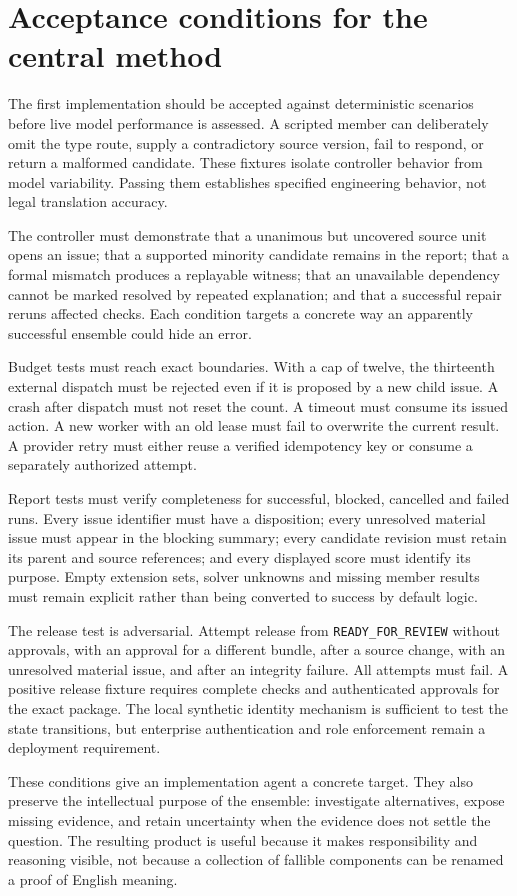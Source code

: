 \section{Acceptance conditions for the central method}
\label{merge:M06:25}


The first implementation should be accepted against deterministic scenarios
before live model performance is assessed. A scripted member can deliberately
omit the type route, supply a contradictory source version, fail to respond, or
return a malformed candidate. These fixtures isolate controller behavior from
model variability. Passing them establishes specified engineering behavior, not
legal translation accuracy.

The controller must demonstrate that a unanimous but uncovered source unit opens
an issue; that a supported minority candidate remains in the report; that a
formal mismatch produces a replayable witness; that an unavailable dependency
cannot be marked resolved by repeated explanation; and that a successful repair
reruns affected checks. Each condition targets a concrete way an apparently
successful ensemble could hide an error.

Budget tests must reach exact boundaries. With a cap of twelve, the thirteenth
external dispatch must be rejected even if it is proposed by a new child issue.
A crash after dispatch must not reset the count. A timeout must consume its
issued action. A new worker with an old lease must fail to overwrite the current
result. A provider retry must either reuse a verified idempotency key or consume
a separately authorized attempt.


Report tests must verify completeness for successful, blocked, cancelled and
failed runs. Every issue identifier must have a disposition; every unresolved
material issue must appear in the blocking summary; every candidate revision
must retain its parent and source references; and every displayed score must
identify its purpose. Empty extension sets, solver unknowns and missing member
results must remain explicit rather than being converted to success by default
logic.

The release test is adversarial. Attempt release from
\texttt{READY\_FOR\_REVIEW} without approvals, with an approval for a different
bundle, after a source change, with an unresolved material issue, and after an
integrity failure. All attempts must fail. A positive release fixture requires
complete checks and authenticated approvals for the exact package. The local
synthetic identity mechanism is sufficient to test the state transitions, but
enterprise authentication and role enforcement remain a deployment requirement.

These conditions give an implementation agent a concrete target. They also
preserve the intellectual purpose of the ensemble: investigate alternatives,
expose missing evidence, and retain uncertainty when the evidence does not settle
the question. The resulting product is useful because it makes responsibility
and reasoning visible, not because a collection of fallible components can be
renamed a proof of English meaning.
